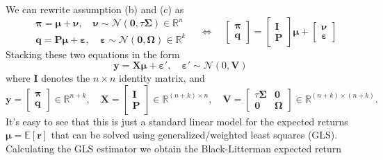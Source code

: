 \documentclass[13pt]{article}
\theoremstyle{definition}
\theoremstyle{remark}
\begin{document}
We can rewrite assumption (b) and (c) as 
$$
\begin{aligned}
& \bm{\pi}=\bm{\mu}+\bm{\nu}, \quad \bm{\nu} \sim \mathcal{N}(\bm{0}, \tau \mathbf{\Sigma})\in \mathbb{R}^n \\
& \bm{q}=\mathbf{P} \bm{\mu}+\bm{\bm{\varepsilon}}, \quad \bm{\bm{\varepsilon}} \sim \mathcal{N}(\bm{0}, \mathbf{\Omega})\in \mathbb{R}^k
\end{aligned} \quad \Longleftrightarrow \quad \begin{bmatrix}\bm{\pi} \\
\bm{q}\end{bmatrix} = \begin{bmatrix}\mathbf{I} \\
\mathbf{P}\end{bmatrix}\bm{\mu} + \begin{bmatrix}\bm{\nu} \\
\bm{\bm{\varepsilon}}\end{bmatrix}
$$
Stacking these two equations in the form
$$
\bm{y}=\mathbf{X} \bm{\mu}+\bm{\bm{\varepsilon}}', \quad \bm{\bm{\varepsilon}}' \sim \mathcal{N}(0, \mathbf{V})
$$
where $\mathbf{I}$ denotes the $n \times n$ identity matrix, and 
$$
\bm{y}=\begin{bmatrix}\bm{\pi} \\
\bm{q}\end{bmatrix}\in \mathbb{R}^{n+k}, \quad \mathbf{X}=\begin{bmatrix}\mathbf{I} \\
\mathbf{P}\end{bmatrix}\in \mathbb{R}^{(n+k)\times n}, \quad \mathbf{V}=\begin{bmatrix}\tau \mathbf{\Sigma} & \bm{0}\\
\bm{0} & \mathbf{\Omega}\end{bmatrix}\in \mathbb{R}^{(n+k)\times (n+k)}.
$$
It's easy to see that this is just a standard linear model for the expected returns $\bm{\mu}=\mathbb{E}[\bm{r}]$ that can be solved using generalized/weighted least squares (GLS). Calculating the GLS estimator we obtain the Black-Litterman expected return
\end{document}
